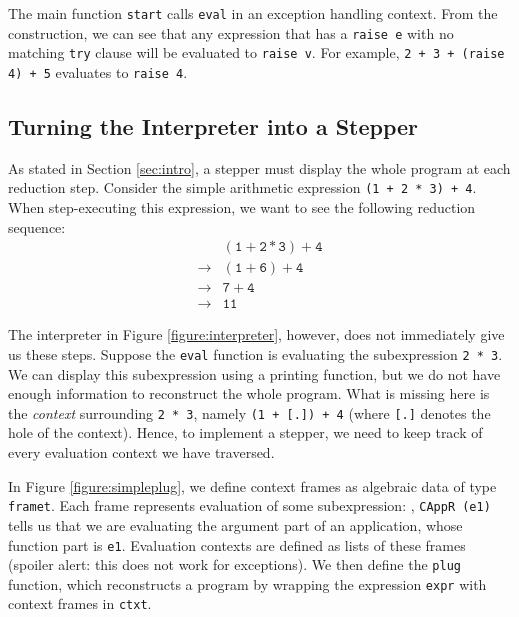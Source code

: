 The main function \texttt{start} calls \texttt{eval} in an exception handling context.  From the construction, we can see that any expression that has a \texttt{raise e} with no matching \texttt{try} clause will be evaluated to \texttt{raise v}.  For example, \texttt{2 + 3 + (raise 4) + 5} evaluates to \texttt{raise 4}.

\subsection{Turning the Interpreter into a Stepper}
\label{sec:imp:stepper}

As stated in Section \ref{sec:intro}, a stepper must display the whole program at each reduction step.  Consider the simple arithmetic expression \texttt{(1 + 2 * 3) + 4}.  When step-executing this expression, we want to see the following reduction sequence:
\[
\begin{array}{cl}
            & \mathtt{(1 + 2 * 3) + 4} \\
\rightarrow & \mathtt{(1 + 6) + 4} \\
\rightarrow & \mathtt{7 + 4} \\
\rightarrow & \mathtt{11}
\end{array}
\]

The interpreter in Figure \ref{figure:interpreter}, however, does not immediately give us these steps.  Suppose the \texttt{eval} function is evaluating the subexpression \texttt{2 * 3}.  We can display this subexpression using a printing function, but we do not have enough information to reconstruct the whole program.  What is missing here is the \emph{context} surrounding \texttt{2 * 3}, namely \texttt{(1 + [.])\ + 4} (where \texttt{[.]} denotes the hole of the context).  Hence, to implement a stepper, we need to keep track of every evaluation context we have traversed.  

In Figure \ref{figure:simpleplug}, we define context frames as algebraic data of type \texttt{frame\US t}.  Each frame represents evaluation of some subexpression: \eg, \texttt{CAppR (e1)} tells us that we are evaluating the argument part of an application, whose function part is \texttt{e1}.  Evaluation contexts are defined as lists of these frames (spoiler alert: this does not work for exceptions).  We then define the \texttt{plug} function, which reconstructs a program by wrapping the expression \texttt{expr} with context frames in \texttt{ctxt}. 

